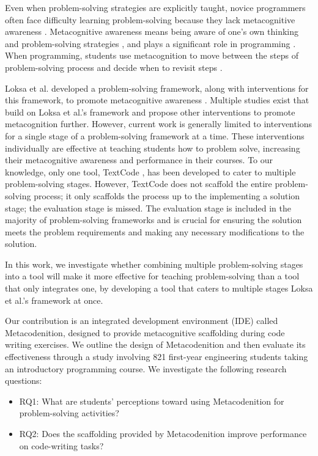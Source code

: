 \documentclass[sigconf,authorversion,nonacm]{acmart}
\begin{document}
Even when problem-solving strategies are explicitly taught, novice programmers often face difficulty learning problem-solving because they lack metacognitive awareness \cite{anneli1993, loksa2016, mani2013}. Metacognitive awareness means being aware of one's own thinking and problem-solving strategies \cite{gibson1996}, and plays a significant role in programming \cite{parham2010}. When programming, students use metacognition to move between the steps of problem-solving process and decide when to revisit steps \cite{parham2010}.

Loksa et al. developed a problem-solving framework, along with interventions for this framework, to promote metacognitive awareness \cite{loksa20162}. Multiple studies exist that build on Loksa et al.'s framework and propose other interventions to promote metacognition further. However, current work is generally limited to interventions for a single stage of a problem-solving framework at a time. These interventions individually are effective at teaching students how to problem solve, increasing their metacognitive awareness and performance in their courses. To our knowledge, only one tool, TextCode \cite{corno2021}, has been developed to cater to multiple problem-solving stages. However, TextCode does not scaffold the entire problem-solving process; it only scaffolds the process up to the implementing a solution stage; the evaluation stage is missed. The evaluation stage is included in the majority of problem-solving frameworks and is crucial for ensuring the solution meets the problem requirements and making any necessary modifications to the solution.

In this work, we investigate whether combining multiple problem-solving stages into a tool will make it more effective for teaching problem-solving than a tool that only integrates one, by developing a tool that caters to multiple stages Loksa et al.'s framework at once.

Our contribution is an integrated development environment (IDE) called Metacodenition, designed to provide metacognitive scaffolding during code writing exercises. We outline the design of Metacodenition and then evaluate its effectiveness through a study involving 821 first-year engineering students taking an introductory programming course. We investigate the following research questions:
\begin{itemize}
\item RQ1: What are students' perceptions toward using Metacodenition for problem-solving activities?
\item RQ2: Does the scaffolding provided by Metacodenition improve performance on code-writing tasks?
\end{itemize}
\end{document}
